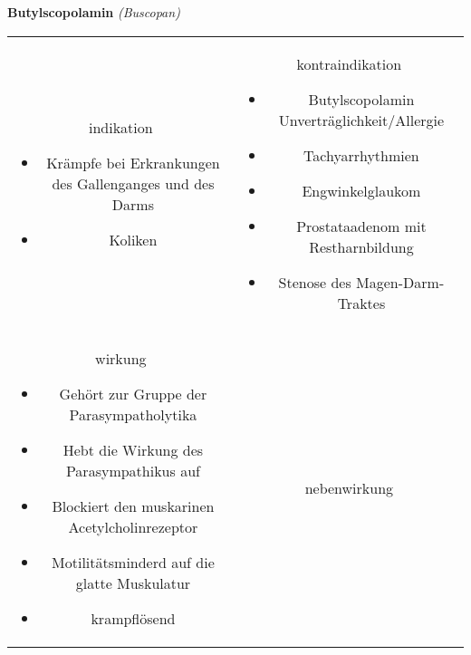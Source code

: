 \documentclass[12pt]{beamer}
\begin{document}
\begin{frame}{
    \textbf{Butylscopolamin}
    \textit{(Buscopan)}
}
    \begin{tabular}{c c}
        \begin{beamercolorbox}[wd=\boxwidth\textwidth,ht=\boxheight\textheight,sep=1em]{indikation}
            \begin{itemize}
                \item Krämpfe bei Erkrankungen des Gallenganges und des Darms
                \item Koliken	
            \end{itemize}
        \end{beamercolorbox} & 
        \begin{beamercolorbox}[wd=\boxwidth\textwidth,ht=\boxheight\textheight,sep=1em]{kontraindikation}
            \scriptsize
            \begin{itemize}
                \item Butylscopolamin Unverträglichkeit/Allergie
                \item Tachyarrhythmien
                \item Engwinkelglaukom
                \item Prostataadenom mit Restharnbildung
                \item Stenose des Magen-Darm-Traktes
            \end{itemize}
        \end{beamercolorbox} \\
        \begin{beamercolorbox}[wd=\boxwidth\textwidth,ht=\boxheight\textheight,sep=1em]{wirkung}
            \scriptsize
            \begin{itemize}
                \item Gehört zur Gruppe der Parasympatholytika
                \item Hebt die Wirkung des Parasympathikus auf
                \item Blockiert den muskarinen Acetylcholinrezeptor
                \item Motilitätsminderd auf die glatte Muskulatur
                \item krampflösend
            \end{itemize}
        \end{beamercolorbox} & 
        \begin{beamercolorbox}[wd=\boxwidth\textwidth,ht=\boxheight\textheight,sep=1em]{nebenwirkung}
            \tiny

\end{beamercolorbox}
\end{tabular}
\end{frame}
\end{document}
